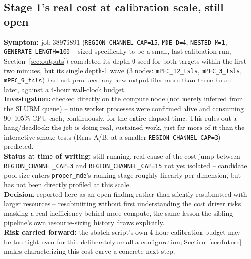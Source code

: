 \documentclass[11pt]{article}
\begin{document}
\subsection{Stage 1's real cost at calibration scale, still open}
\label{sec:history-stage1-cost}
\textbf{Symptom:} job 38976891 (\texttt{REGION\_CHANNEL\_CAP=15}, \texttt{MDE\_D=4}, \texttt{NESTED\_M=1}, \texttt{GENERATE\_LENGTH=100} -- sized specifically to be a small, fast calibration run, Section~\ref{sec:outputs}) completed its depth-0 seed for both targets within the first two minutes, but its single depth-1 wave (3 nodes: \texttt{mPFC\_12\_tsls}, \texttt{mPFC\_3\_tsls}, \texttt{mPFC\_9\_tsls}) had not produced any new output files more than three hours later, against a 4-hour wall-clock budget.\\
\textbf{Investigation:} checked directly on the compute node (not merely inferred from the SLURM queue) -- nine worker processes were confirmed alive and consuming 90--105\% CPU each, continuously, for the entire elapsed time. This rules out a hang/deadlock: the job is doing real, sustained work, just far more of it than the interactive smoke tests (Runs A/B, at a smaller \texttt{REGION\_CHANNEL\_CAP=3}) predicted.\\
\textbf{Status at time of writing:} still running, real cause of the cost jump between \texttt{REGION\_CHANNEL\_CAP=3} and \texttt{REGION\_CHANNEL\_CAP=15} not yet isolated -- candidate pool size enters \texttt{proper\_mde}'s ranking stage roughly linearly per dimension, but has not been directly profiled at this scale.\\
\textbf{Decision:} reported here as an open finding rather than silently resubmitted with larger resources -- resubmitting without first understanding the cost driver risks masking a real inefficiency behind more compute, the same lesson the sibling pipeline's own resource-sizing history draws explicitly.\\
\textbf{Risk carried forward:} the sbatch script's own 4-hour calibration budget may be too tight even for this deliberately small a configuration; Section~\ref{sec:future} makes characterizing this cost curve a concrete next step.
\end{document}
